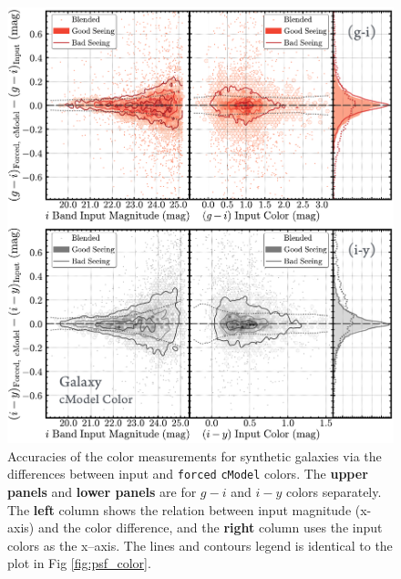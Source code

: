 \documentclass[useamsfonts]{pasj01}
\def\cmodel{\texttt{cModel}}
\def\forced{\texttt{forced}}
\begin{document}
\begin{figure}
    \begin{center}
        \includegraphics[width=\textwidth]{fig/synpipe_galaxy_color}
    \end{center}
    \caption{
        Accuracies of the color measurements for synthetic galaxies via the
        differences between input and \forced{} \cmodel{} colors.
        The \textbf{upper panels} and \textbf{lower panels} are for $g-i$ and $i-y$
        colors separately.
        The \textbf{left} column shows the relation between input magnitude (x-axis) and
        the color difference, and the \textbf{right} column uses the input colors as
        the x--axis.
        The lines and contours legend is identical to the plot in 
        Fig \ref{fig:psf_color}.
        }
    \label{fig:cmodel_color}
\end{figure}
\end{document}
